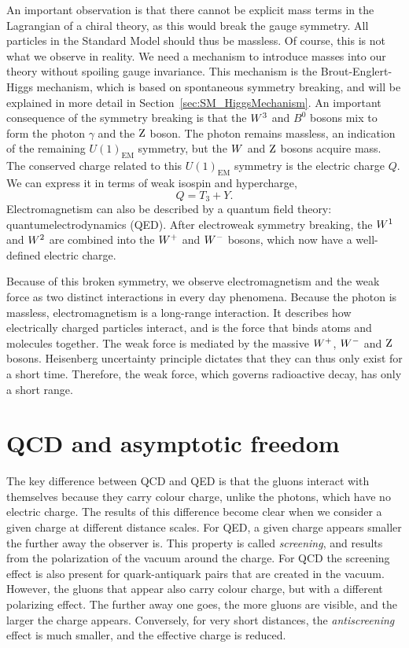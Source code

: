 An important observation is that there cannot be explicit mass terms in the Lagrangian of a chiral
theory, as this would break the gauge symmetry. All particles in the Standard Model should thus be
massless.
Of course, this is not what we observe in reality. 
We need a mechanism to introduce masses into our theory without spoiling gauge
invariance. This mechanism is the Brout-Englert-Higgs mechanism, which is based on spontaneous
symmetry breaking, and will be explained in more detail in Section~\ref{sec:SM_HiggsMechanism}.
An important consequence of the symmetry breaking is that the $W^3$ and $B^0$ bosons mix to
form the photon $\gamma$ and the $\mathrm{Z}$ boson. 
The photon remains massless, an indication of the remaining $U(1)_{\text{EM}}$ symmetry,
but the $W$ and $\mathrm{Z}$ bosons acquire mass. 
The conserved charge related to this $U(1)_{\text{EM}}$ symmetry is the electric charge $Q$. We can
express it in terms of weak isospin and hypercharge,
\begin{equation}
  Q = T_3 + Y .
\end{equation}
Electromagnetism can also be described by a quantum field theory: quantumelectrodynamics (QED).
After electroweak symmetry breaking, the $W^1$ and $W^2$ are combined into the $W^+$ and $W^-$
bosons, which now have a well-defined electric charge. 

Because of this broken symmetry, we observe electromagnetism and the weak force as two distinct
interactions in every day phenomena. 
Because the photon is massless, electromagnetism is a long-range interaction. It describes how
electrically charged particles interact, and is the force that binds atoms and molecules together.
The weak force is mediated by the massive $W^+$, $W^-$ and $\mathrm{Z}$ bosons.
Heisenberg uncertainty principle dictates that they can thus only exist for a short time. Therefore,
the weak force, which governs radioactive decay, has only a short range.



\section{QCD and asymptotic freedom \label{sec:SM_QCD}}

The key difference between QCD and QED is that the gluons interact with themselves because they
carry colour charge, unlike the photons, which have no electric charge. The results of this
difference become clear when we consider a given charge at different distance scales. For QED, a
given charge appears smaller the further away the observer is. This property is called
\textit{screening}, and results from the polarization of the vacuum around the charge. 
For QCD the screening effect is also present for quark-antiquark pairs that are created in the
vacuum. However, the gluons that appear also carry colour charge, but with a different polarizing
effect. The further away one goes, the more gluons are visible, and the larger the charge appears.
Conversely, for very short distances, the \textit{antiscreening} effect is much smaller, and the
effective charge is reduced. 

